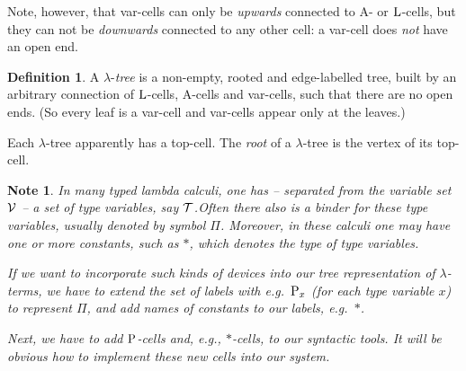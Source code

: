 \documentclass{article}
\theoremstyle{plain}
\newtheorem{Note}[The]{Note}
\theoremstyle{definition}
\newtheorem{Def}[The]{Definition}
\begin{document}

Note, however, that var-cells can only be {\em upwards\/} connected to A- or ${{\rm L}}$-cells, but they can not be {\em downwards\/} connected to any other cell: a var-cell does {\em not\/} have an open end.


\begin{Def}
A $\lambda$-{\em tree\/} is a non-empty, rooted and edge-labelled tree, built by an arbitrary connection of ${\rm L}$-cells, A-cells and var-cells, such that there are no open ends. (So every leaf is a var-cell and var-cells appear only at the leaves.)


Each $\lambda$-tree apparently has a top-cell. The {\em root\/} of a $\lambda$-tree is the vertex of its top-cell.
\end{Def}

\begin{Note}\label{NamCarNoo}
In many {\em typed\/} lambda calculi, one has -- separated from the variable set ${\cal V}$ --  a set of {\em type variables\/}, say ${\cal T}$.Often there also is a binder for these type variables, usually denoted by symbol $\Pi$.
Moreover, in these calculi one may have one or more {\em constants\/}, such as $\ast$, which denotes the type of type variables.

If we want to incorporate such kinds of  devices into our tree representation of $\lambda$-terms, we have to extend the set of labels with e.g.\ ${\rm P}_x$ (for each type variable $x$) to represent $\Pi$, and add names of constants to our labels, e.g.\ $\ast$.

Next, we have to add ${\rm P}$-cells and, e.g., $\ast$-cells, to our syntactic tools. It will be obvious how to implement these new cells into our system.


\end{Note}
\end{document}

